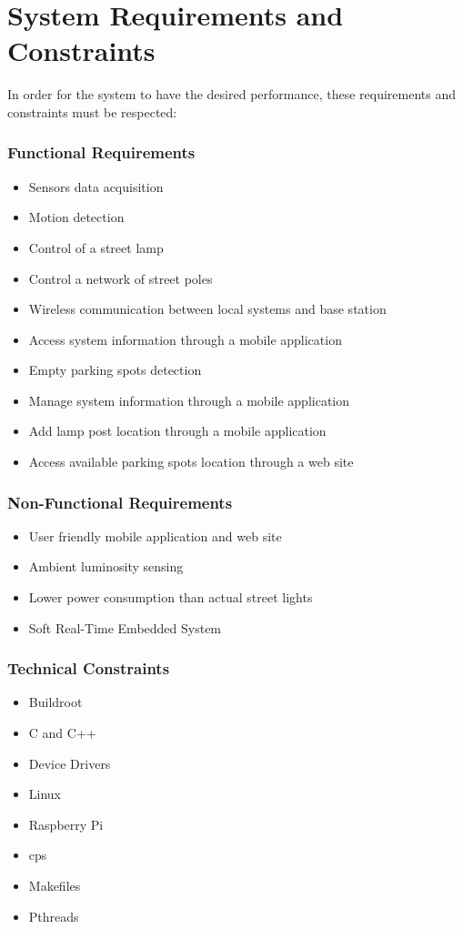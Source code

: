 \section{System Requirements and Constraints}
In order for the system to have the desired performance, these requirements and constraints must be respected:
\subsubsection{Functional Requirements}
\begin{itemize}
        \item Sensors data acquisition                          
        \item Motion detection
        \item Control of a street lamp
		\item Control a network of street poles
        \item Wireless communication between local systems and base station
		\item Access system information through a mobile application
        \item Empty parking spots detection
        \item Manage system information through a mobile application
        \item Add lamp post location through a mobile application
        \item Access available parking spots location through a web site
\end{itemize}
\subsubsection{Non-Functional Requirements}
\begin{itemize}
        \item User friendly mobile application and web site
        \item Ambient luminosity sensing
        \item Lower power consumption than actual street lights
        \item Soft Real-Time Embedded System
\end{itemize}
\subsubsection{Technical Constraints}
\begin{itemize}
        \item Buildroot
        \item C and C++ 
        \item Device Drivers
        \item Linux
        \item Raspberry Pi
        \item \ac{cps}
        \item Makefiles
        \item Pthreads
\end{itemize}
